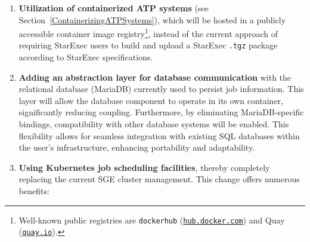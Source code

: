 \documentclass{easychair}
\newenvironment{packed_itemize}{
\vspace*{-0.3em}
\begin{itemize}
\setlength{\partopsep}{0pt}
\setlength{\itemsep}{1pt}
\setlength{\parskip}{0pt}
\setlength{\parsep}{0pt}
}{\end{itemize}}
\begin{document}
\begin{enumerate}
\item \textbf{Utilization of containerized ATP systems} (see 
      Section~\ref{ContainerizingATPSystems}), which will be hosted in a publicly accessible 
      container image registry\footnote{%
      Well-known public registries are {\tt dockerhub} 
      (\href{https://hub.docker.com/}{\tt hub.docker.com}) and Quay 
      (\href{https://quay.io/}{\tt quay.io}).},
      instead of the current approach of requiring StarExec users to build and upload a 
      StarExec {\tt .tgz} package according to StarExec specifications.
\item \textbf{Adding an abstraction layer for database communication} with the relational 
      database (MariaDB) currently used to persist job information.  
      This layer will allow the database component to operate in its own container, significantly 
      reducing coupling. 
      Furthermore, by eliminating MariaDB-specific bindings, compatibility with other database 
      systems will be enabled. 
      This flexibility allows for seamless integration with existing SQL databases within the 
      user's infrastructure, enhancing portability and adaptability.
\item \textbf{Using Kubernetes job scheduling facilities}, thereby completely replacing the 
      current SGE cluster management.
      This change offers numerous benefits: 
\end{enumerate}
\end{document}
